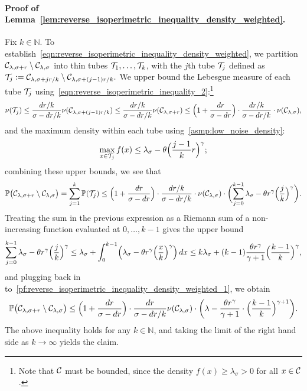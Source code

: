 \paragraph{Proof of Lemma~\ref{lem:reverse_isoperimetric_inequality_density_weighted}.}
	Fix $k \in \mathbb{N}$. To establish~\eqref{eqn:reverse_isoperimetric_inequality_density_weighted}, we partition $\mathcal{C}_{\lambda,\sigma + r} \setminus \mathcal{C}_{\lambda,\sigma}$ into thin tubes $\mathcal{T}_{1},\ldots,\mathcal{T}_{k}$, with the $j$th tube $\mathcal{T}_j$ defined as $\mathcal{T}_j := \mathcal{C}_{\lambda,\sigma + jr/k} \setminus \mathcal{C}_{\lambda,\sigma + (j - 1)r/k}.$ We upper bound the Lebesgue measure of each tube $\mathcal{T}_j$ using~\eqref{eqn:reverse_isoperimetric_inequality_2}:\footnote{Note that $\mathcal{C}$ must be bounded, since the density $f(x) \geq \lambda_{\sigma} > 0$ for all $x \in \mathcal{C}$.}
	\begin{equation*}
	\nu(\mathcal{T}_j) \leq \frac{dr/k}{\sigma - dr/k} \nu(\mathcal{C}_{\lambda,\sigma + (j - 1)r/k}) \leq \frac{dr/k}{\sigma - dr/k} \nu(\mathcal{C}_{\lambda,\sigma + r}) \leq \Bigl(1 + \frac{dr}{\sigma - dr}\Bigr) \cdot \frac{dr/k}{\sigma - dr/k}  \cdot \nu(\mathcal{C}_{\lambda,\sigma}),
	\end{equation*}
	and the maximum density within each tube using~\ref{asmp:low_noise_density}:
	\begin{equation*}
	\max_{x \in \mathcal{T}_j} f(x) \leq \lambda_{\sigma} - \theta \Bigl(\frac{j - 1}{k}r\Bigr)^{\gamma};
	\end{equation*}
	combining these upper bounds, we see that
	\begin{equation}
	\label{pf:reverse_isoperimetric_inequality_density_weighted_1}
	\mathbb{P}\bigl(\mathcal{C}_{\lambda,\sigma + r} \setminus \mathcal{C}_{\lambda,\sigma}\bigr) = \sum_{j = 1}^{k} \mathbb{P}(\mathcal{T}_j) \leq \Bigl(1 + \frac{dr}{\sigma - dr}\Bigr) \cdot  \frac{dr/k}{\sigma - dr/k} \cdot \nu(\mathcal{C}_{\lambda,\sigma}) \cdot \biggl(\sum_{j = 0}^{k - 1}\lambda_{\sigma} -  \theta r^{\gamma} \Bigl(\frac{j}{k}\Bigr)^{\gamma} \biggr).
	\end{equation}
	Treating the sum in the previous expression as a Riemann sum of a non-increasing function evaluated at $0,\ldots,k -1$ gives the upper bound
	\begin{equation*}
	\sum_{j = 0}^{k - 1}\lambda_{\sigma} -  \theta r^{\gamma} \Bigl(\frac{j}{k}\Bigr)^{\gamma } \leq \lambda_{\sigma} + \int_{0}^{k - 1} \Bigl(\lambda_{\sigma} -  \theta r^{\gamma} \Bigl(\frac{x}{k}\Bigr)^{\gamma}\Bigr) \,dx \leq k\lambda_{\sigma} + (k - 1)\frac{\theta r^{\gamma}}{\gamma + 1} \Bigl(\frac{k - 1}{k}\Bigr)^{\gamma},
	\end{equation*}
	and plugging back in to~\eqref{pf:reverse_isoperimetric_inequality_density_weighted_1}, we obtain
	\begin{equation*}
	\mathbb{P}\bigl(\mathcal{C}_{\lambda,\sigma + r} \setminus \mathcal{C}_{\lambda,\sigma}\bigr) \leq  \Bigl(1 + \frac{dr}{\sigma - dr}\Bigr) \cdot \frac{dr}{\sigma - dr/k} \nu(\mathcal{C}_{\lambda,\sigma}) \cdot \biggl(\lambda - \frac{\theta r^{\gamma}}{\gamma + 1} \cdot \Bigl(\frac{k - 1}{k}\Bigr)^{\gamma + 1} \biggl).
	\end{equation*}
	The above inequality holds for any $k \in \mathbb{N}$, and taking the limit of the right hand side as $k \to \infty$ yields the claim.

